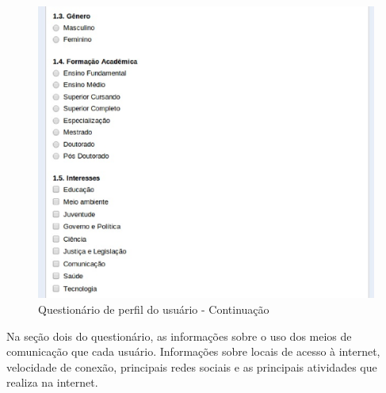 \begin{figure}[!h]
    \centering
    \includegraphics[keepaspectratio=true,scale=0.60]
      {figuras/perf2.eps}
     \caption{Questionário de perfil do usuário - Continuação}
    \label{perfilgeral}
\end{figure}
	
\newpage

	Na seção dois do questionário, as informações sobre o uso dos meios de comunicação que cada usuário. Informações sobre locais de acesso à internet, velocidade de conexão, principais redes sociais e as principais atividades que realiza na internet. 


